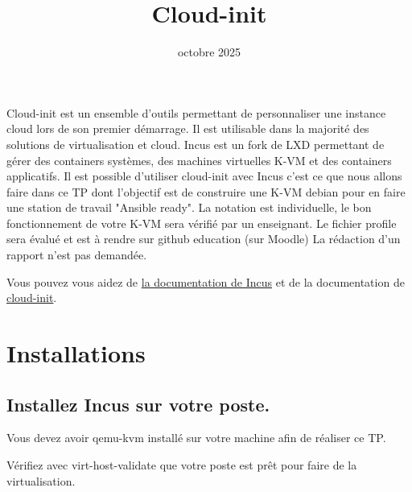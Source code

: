 

\usepackage{titlepic}
\title{Cloud-init}


\date{octobre 2025}

\noprintanswers

\usepackage{graphicx}
\graphicspath{{./images/}}







\maketitle


Cloud-init est un ensemble d'outils permettant de personnaliser une instance cloud lors de son premier démarrage.
Il est utilisable dans la majorité des solutions de virtualisation et cloud.
Incus est un fork de LXD permettant de gérer des containers systèmes, des machines virtuelles K-VM et des containers applicatifs.
Il est possible d'utiliser cloud-init avec Incus c'est ce que nous allons faire dans ce TP 
dont l'objectif est de construire une K-VM debian pour en faire une station de travail "Ansible ready".
La notation est individuelle, le bon fonctionnement de votre K-VM sera vérifié par un enseignant. 
Le fichier profile sera évalué et est à rendre sur github education (sur Moodle)
La rédaction d'un rapport n'est pas demandée.

Vous pouvez vous aidez de \href{https://linuxcontainers.org/incus/docs/main/cloud-init/}{la documentation de Incus} 
et de la documentation de \href{https://cloudinit.readthedocs.io/en/latest/topics/examples.html}{cloud-init}. 


\section{Installations}


\subsection {Installez Incus sur votre poste.}

Vous devez avoir qemu-kvm installé sur votre machine afin de réaliser ce TP.

Vérifiez avec virt-host-validate que votre poste est prêt pour faire de la virtualisation.

